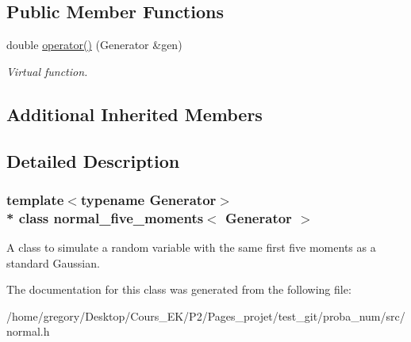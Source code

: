 \subsection*{Public Member Functions}
\begin{DoxyCompactItemize}
\item 
double \hyperlink{classnormal__five__moments_adca4add1bfd8ea199bd63c80ab48b2d1}{operator()} (Generator \&gen)\hypertarget{classnormal__five__moments_adca4add1bfd8ea199bd63c80ab48b2d1}{}\label{classnormal__five__moments_adca4add1bfd8ea199bd63c80ab48b2d1}

\begin{DoxyCompactList}\small\item\em Virtual function. \end{DoxyCompactList}\end{DoxyCompactItemize}
\subsection*{Additional Inherited Members}


\subsection{Detailed Description}
\subsubsection*{template$<$typename Generator$>$\\*
class normal\+\_\+five\+\_\+moments$<$ Generator $>$}

A class to simulate a random variable with the same first five moments as a standard Gaussian. 

The documentation for this class was generated from the following file\+:\begin{DoxyCompactItemize}
\item 
/home/gregory/\+Desktop/\+Cours\+\_\+\+E\+K/\+P2/\+Pages\+\_\+projet/test\+\_\+git/proba\+\_\+num/src/normal.\+h\end{DoxyCompactItemize}
